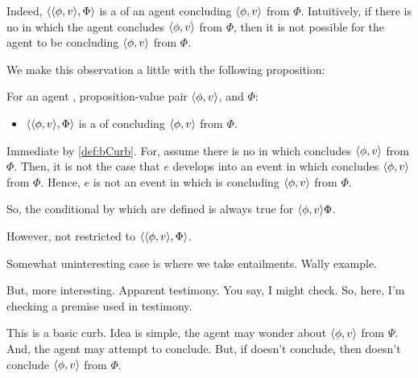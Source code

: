 \begin{note}
  Indeed, \(\langle \langle \phi, v \rangle, \Phi \rangle\) is a \bCurb{} of an agent concluding \(\langle \phi, v \rangle\) from \(\Phi\).
  Intuitively, if there is no \pevent{} in which the agent concludes \(\langle \phi, v \rangle\) from \(\Phi\), then it is not possible for the agent to be concluding \(\langle \phi, v \rangle\) from \(\Phi\).

  We make this observation a little with the following proposition:

  \begin{proposition}
    For an agent \vAgent{}, proposition-value pair \(\langle \phi, v \rangle\), and \poP{} \(\Phi\):

    \begin{itemize}
    \item
      \(\langle \langle \phi, v \rangle, \Phi \rangle\) is a \bCurb{} of \vAgent{} concluding \(\langle \phi, v \rangle\) from \(\Phi\).
    \end{itemize}
    \begin{argument}
      Immediate by \autoref{def:bCurb}.
      For, assume there is no \pevent{} in which \vAgent{} concludes \(\langle \phi, v \rangle\) from \(\Phi\).
      Then, it is not the case that \(e\) develops into an event in which \vAgent{} concludes \(\langle \phi, v \rangle\) from \(\Phi\).
      Hence, \(e\) is not an event in which \vAgent{} is concluding \(\langle \phi, v \rangle\) from \(\Phi\).

      So, the conditional by which  are defined is always true for \(\langle \phi, v \rangle{\Phi}\).
    \end{argument}
  \end{proposition}
\end{note}

\begin{note}
  However, not restricted to \(\langle \langle \phi, v \rangle, \Phi \rangle\).

  Somewhat uninteresting case is where we take entailments.
  Wally example.

  But, more interesting.
  Apparent testimony.
  You say, I might check.
  So, here, I'm checking a premise used in testimony.
\end{note}

\begin{note}
  This is a basic curb.
  Idea is simple, the agent may wonder about \(\langle \phi, v \rangle\) from \(\Psi\).
  And, the agent may attempt to conclude.
  But, if doesn't conclude, then doesn't conclude \(\langle \phi, v \rangle\) from \(\Phi\).
\end{note}

\section{}
\label{sec:curb}

